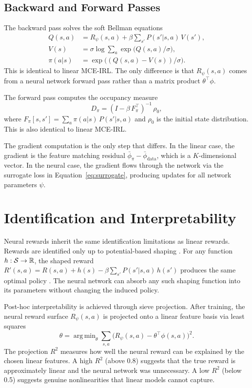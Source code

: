 \documentclass[10pt]{article}
\DeclareMathOperator*{\argmin}{arg\,min}
\begin{document}
\subsection{Backward and Forward Passes}

The backward pass solves the soft Bellman equations
\begin{align}
Q(s,a) &= R_\psi(s,a) + \beta \sum_{s'} P(s'|s,a)\, V(s'), \\
V(s) &= \sigma \log \sum_a \exp\bigl(Q(s,a)/\sigma\bigr), \\
\pi(a|s) &= \exp\bigl((Q(s,a) - V(s))/\sigma\bigr).
\end{align}
This is identical to linear MCE-IRL. The only difference is that $R_\psi(s,a)$ comes from a neural network forward pass rather than a matrix product $\theta^\top\phi$.

The forward pass computes the occupancy measure
\begin{equation}
D_\pi = (I - \beta\, F_\pi^\top)^{-1}\, \rho_0,
\end{equation}
where $F_\pi[s,s'] = \sum_a \pi(a|s)\, P(s'|s,a)$ and $\rho_0$ is the initial state distribution. This is also identical to linear MCE-IRL.

The gradient computation is the only step that differs. In the linear case, the gradient is the feature matching residual $\bar\phi_\pi - \bar\phi_{\text{data}}$, which is a $K$-dimensional vector. In the neural case, the gradient flows through the network via the surrogate loss in Equation~\eqref{eq:surrogate}, producing updates for all network parameters $\psi$.


\section{Identification and Interpretability}

Neural rewards inherit the same identification limitations as linear rewards. Rewards are identified only up to potential-based shaping \citep{ng1999}. For any function $h: \mathcal{S} \to \mathbb{R}$, the shaped reward $R'(s,a) = R(s,a) + h(s) - \beta \sum_{s'} P(s'|s,a)\, h(s')$ produces the same optimal policy \citep{kim2021}. The neural network can absorb any such shaping function into its parameters without changing the induced policy.

Post-hoc interpretability is achieved through sieve projection. After training, the neural reward surface $R_\psi(s,a)$ is projected onto a linear feature basis via least squares
\begin{equation}
\hat\theta = \argmin_\theta \sum_{s,a} \bigl(R_\psi(s,a) - \theta^\top\phi(s,a)\bigr)^2.
\end{equation}
The projection $R^2$ measures how well the neural reward can be explained by the chosen linear features. A high $R^2$ (above 0.8) suggests that the true reward is approximately linear and the neural network was unnecessary. A low $R^2$ (below 0.5) suggests genuine nonlinearities that linear models cannot capture.
\end{document}
